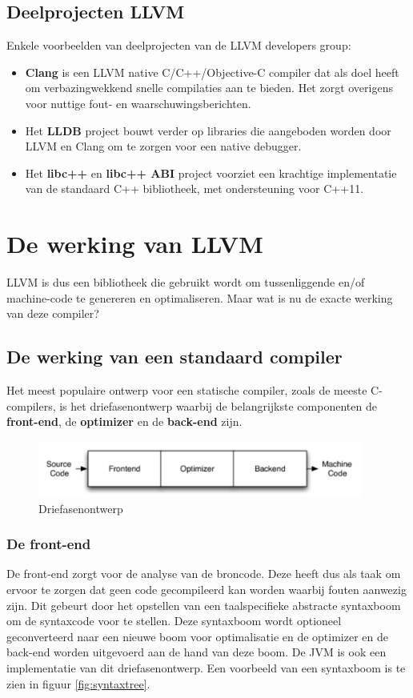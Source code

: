 \subsection{Deelprojecten LLVM}
Enkele voorbeelden van deelprojecten van de LLVM developers group:
\begin{itemize}
	\item \textbf{Clang} is een LLVM native C/C++/Objective-C compiler dat als doel heeft om verbazingwekkend snelle compilaties aan te bieden. Het zorgt overigens voor nuttige fout- en waarschuwingsberichten.
	\newline
	\item Het \textbf{LLDB} project bouwt verder op libraries die aangeboden worden door LLVM en Clang om te zorgen voor een native debugger.
	\newline
	\item Het \textbf{libc++} en \textbf{libc++ ABI} project voorziet een krachtige implementatie van de standaard C++ bibliotheek, met ondersteuning voor C++11. 
\end{itemize}

\section{De werking van LLVM}
LLVM is dus een bibliotheek die gebruikt wordt om tussenliggende en/of machine-code te genereren en optimaliseren. Maar wat is nu de exacte werking van deze compiler?

\subsection{De werking van een standaard compiler}
Het meest populaire ontwerp voor een statische compiler, zoals de meeste C-compilers, is het driefasenontwerp waarbij de belangrijkste componenten de \textbf{front-end}, de \textbf{optimizer} en de \textbf{back-end} zijn. 

\begin{figure} [ht]
	\centering
	\includegraphics[width=0.95\textwidth]{img/driefasenmodel}
	\caption{Driefasenontwerp}
	\label{fig:driefasenontwerp}
\end{figure}

\subsubsection{De front-end}
De front-end zorgt voor de analyse van de broncode. Deze heeft dus als taak om ervoor te zorgen dat geen code gecompileerd kan worden waarbij fouten aanwezig zijn. Dit gebeurt door het opstellen van een taalspecifieke abstracte syntaxboom om de syntaxcode voor te stellen. Deze syntaxboom wordt optioneel geconverteerd naar een nieuwe boom voor optimalisatie en de optimizer en de back-end worden uitgevoerd aan de hand van deze boom. De JVM is ook een implementatie van dit driefasenontwerp. Een voorbeeld van een syntaxboom is te zien in figuur \ref{fig:syntaxtree}.

